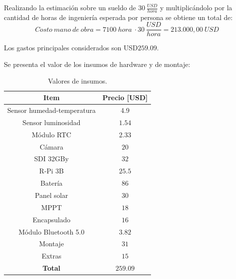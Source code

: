 Realizando la estimación sobre un sueldo de $30 \ \frac{USD}{hora}$ y multiplicándolo por la cantidad de horas de ingeniería esperada por persona se obtiene un total de: $$Costo \ mano \ de \ obra = 7100 \ hora \ \cdot 30 \ \frac{USD}{hora} = 213.000,00 \ USD$$



Los gastos principales considerados son USD$259.09$. %

Se presenta el valor de los insumos de hardware y de montaje:
\begin{table}[H]
\centering
\begin{tabular}{|c|c|}
\hline
\textbf{Item}                                                         & \textbf{Precio [USD]}				  \\ \hline
Sensor humedad-temperatura 											  & 4.9                                   \\ \hline
Sensor luminosidad                                                    & $1.54    $                              \\ \hline
M\'odulo RTC                                                     & $2.33$                                  \\ \hline
Cámara                                                                & $20$                                    \\ \hline
SDI 32GBy                                                             & $32$                                    \\ \hline
R-Pi 3B
 & $25.5$                                  \\ \hline
Batería                                                               & $86  $                 				  \\ \hline
Panel solar                                                           & $30$ 				  \\ \hline
MPPT                                                                  & $18$                                    \\ \hline
Encapsulado                                                           & $16$                                    \\ \hline
Módulo Bluetooth 5.0                                                           & $3.82 $                                   \\ \hline
Montaje                                                               & $31$                                    \\ \hline
Extras
& $15$									\\ \hline
\textbf{Total}
&\textbf{$259.09$} \\ \hline
\end{tabular}
\caption{Valores de insumos.}
\end{table}



